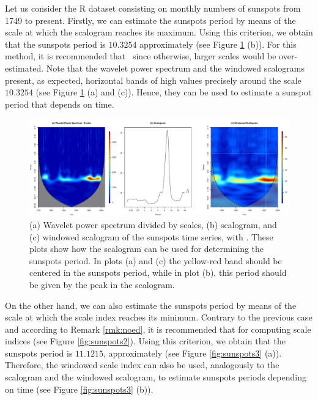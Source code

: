 Let us consider the  R dataset consisting on monthly numbers of sunspots from 1749 to present. Firstly, we can estimate the sunspots period by means of the scale at which the scalogram reaches its maximum. Using this criterion, we obtain that the sunspots period is $10.3254$ approximately (see Figure \ref{fig:sunspots1} (b)). For this method, it is recommended that \, since otherwise, larger scales would be over-estimated. Note that the wavelet power spectrum and the windowed scalograms present, as expected,  horizontal bands of high values precisely around the scale $10.3254$  (see Figure \ref{fig:sunspots1} (a) and (c)). Hence, they can be used to estimate a sunspot period that depends on time.

\begin{figure}[tbp]
\begin{center}
  \includegraphics[width=\textwidth]{Figure15}
\end{center}
\caption{(a) Wavelet power spectrum divided by scales, (b) scalogram, and (c) windowed scalogram of the sunspots time series, with . These plots show how the scalogram can be used for determining the sunspots period. In plots (a) and (c) the yellow-red band should be centered in the sunspots period, while in plot (b), this period should be given by the peak in the scalogram.}
\label{fig:sunspots1}
\end{figure}

On the other hand, we can also estimate the sunspots period by means of the scale at which the scale index reaches its minimum. Contrary to the previous case and according to Remark \ref{rmk:noed}, it is recommended that  for computing scale indices (see Figure \ref{fig:sunspots2}). Using this criterion, we obtain that the sunspots period is $11.1215$, approximately (see Figure \ref{fig:sunspots3} (a)). Therefore, the windowed scale index can also be used, analogously to the scalogram and the windowed scalogram, to estimate sunspots periods depending on time (see Figure \ref{fig:sunspots3} (b)).

